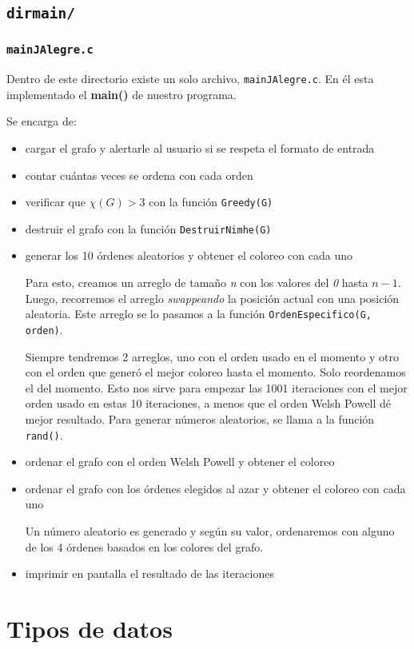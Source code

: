 \documentclass[11pt]{article}   	%
\begin{document}
\subsection{\texttt{dirmain/}}
\subsubsection{\texttt{mainJAlegre.c}}
Dentro de este directorio existe un solo archivo, \texttt{mainJAlegre.c}. En él esta implementado el
\textbf{main()} de nuestro programa. 

Se encarga de:
\begin{itemize}
\item cargar el grafo y alertarle al usuario si se respeta el formato de entrada
\item contar cuántas veces se ordena con cada orden
\item verificar que $\chi(G)>3$ con la función \texttt{Greedy(G)}
\item destruir el grafo con la función \texttt{DestruirNimhe(G)}
\item generar los 10 órdenes aleatorios y obtener el coloreo con cada uno

Para esto, creamos un arreglo de tamaño \emph{n} con los valores del \emph{0} hasta \emph{$n-1$}.
Luego, recorremos el arreglo \textit{swappeando} la posición actual con una posición aleatoria.
Este arreglo se lo pasamos a la función \texttt{OrdenEspecifico(G, orden)}.

Siempre tendremos 2 arreglos, uno con el orden usado en el momento y otro con el orden que generó el mejor coloreo hasta el momento.
Solo reordenamos el del momento. Esto nos sirve para empezar las 1001 iteraciones con el mejor
orden usado en estas 10 iteraciones, a menos que el orden Welsh Powell dé mejor resultado.
Para generar números aleatorios, se llama a la función \texttt{rand()}.
\item ordenar el grafo con el orden Welsh Powell y obtener el coloreo
\item ordenar el grafo con los órdenes elegidos al azar y obtener el coloreo con cada uno

Un número aleatorio es generado y según su valor, ordenaremos con alguno de los 4 órdenes basados en los
colores del grafo.
\item imprimir en pantalla el resultado de las iteraciones
\end{itemize}
\clearpage

\section{Tipos de datos}
\end{document}
